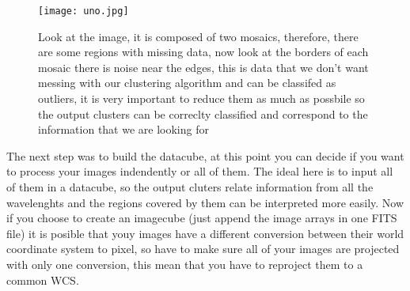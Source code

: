 \documentclass[11pt,fleqn]{book} %
\begin{document}
\begin{figure}[h]
	\centering
    \texttt{[image: uno.jpg]}
    \caption{Look at the image, it is composed of two mosaics, therefore, there are some regions with missing data, now look at the borders of each mosaic there is noise near the edges, this is data that we don't want messing with our clustering algorithm and can be classifed as outliers, it is very important to reduce them as much as possbile so the output clusters can be correclty classified and correspond to the information that we are looking for}
    \label{img:dos}
\end{figure}

The next step was to build the datacube, at this point you can decide if you want to process your images indendently or all of them. The ideal here is to input all of them in a datacube, so the output cluters relate information from all the wavelenghts and the regions covered by them can be interpreted more easily. Now if you choose to create an imagecube (just append the image arrays in one FITS file) it is posible that youy images have a different conversion between their world coordinate system to pixel, so have to make sure all of your images are projected with only one conversion, this mean that you have to reproject them to a common WCS.
\end{document}

